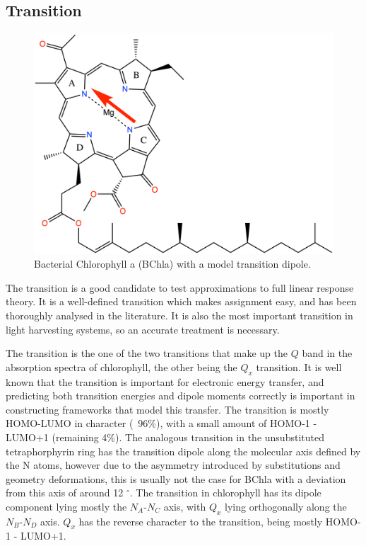 \subsection{\Qy Transition}
\label{subsec:qy_transition}
\begin{figure}
    \centering
    \includegraphics{chapters/chl_xtb/chlorophyll_Qy.png}
    \caption{Bacterial Chlorophyll a (BChla) with a model \Qy transition dipole.}
    \label{fig:bchla_qy}
\end{figure}

The \Qy transition is a good candidate to test approximations to full linear response 
theory. It is a well-defined transition which makes assignment easy, and has been
thoroughly analysed in the literature. It is also the most important transition 
in light harvesting systems, so an accurate treatment is necessary. 

The \Qy transition is the one of the two transitions that make up the $Q$ band in
the absorption spectra of chlorophyll, the other being the $Q_x$ transition. It 
is well known that the \Qy transition is important for electronic energy transfer,
and predicting both transition energies and dipole moments correctly is important 
in constructing frameworks that model this transfer. The \Qy transition is mostly
HOMO-LUMO in character (~96\%), with a small amount of HOMO-1 - LUMO+1 (remaining 4\%).
The analogous transition in the unsubstituted tetraphorphyrin ring has the transition
dipole along the molecular axis defined by the N atoms, however due to the asymmetry 
introduced by substitutions and geometry deformations, this is usually not the case 
for BChla with a deviation from this axis of around 12 $^{\circ}$. The \Qy transition
in chlorophyll has its dipole component lying mostly the $N_A$-$N_C$ axis, with $Q_x$ 
lying orthogonally along the $N_B$-$N_D$ axis. $Q_x$ has the reverse character to 
the \Qy transition, being mostly HOMO-1 - LUMO+1.

